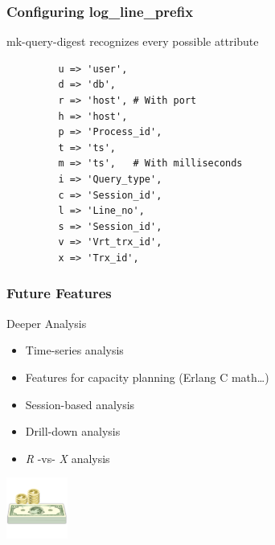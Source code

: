 \begin{frame}[fragile]
   \frametitle{Configuring log\_line\_prefix}
   mk-query-digest recognizes every possible attribute
         \begin{verbatim}
         u => 'user',
         d => 'db',
         r => 'host', # With port
         h => 'host',
         p => 'Process_id',
         t => 'ts',
         m => 'ts',   # With milliseconds
         i => 'Query_type',
         c => 'Session_id',
         l => 'Line_no',
         s => 'Session_id',
         v => 'Vrt_trx_id',
         x => 'Trx_id',
         \end{verbatim}
\end{frame}

\begin{frame}
   \frametitle{Future Features}
   \begin{block}{Deeper Analysis}
   \begin{itemize}
      \item Time-series analysis
      \item Features for capacity planning (Erlang C math\dots)
      \item Session-based analysis
      \item Drill-down analysis
      \item \emph{R} -vs- \emph{X} analysis
   \end{itemize}
   \end{block}
   \includegraphics[width=20mm]{../image/money}
\end{frame}

